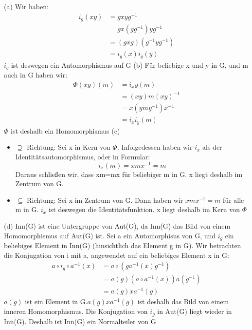 \documentclass{homework}
\begin{document}
\begin{solution}
    (a) Wir haben:
    \begin{align*}
        i_g(xy) &= gxyg^{-1}  \tag*{(nach Definition)} \\
               &= gx(gg^{-1})yg^{-1} \\
               &= (gxg)(g^{-1}yg^{-1}) \\
               &= i_g(x)i_g(y)
     \end{align*}
$i_g$ ist deswegen ein Automorphismus auf G \newline
(b)
Für beliebige x und y in G, und m auch in G haben wir:
\begin{align*}
    \Phi(xy)(m) &= i_xy(m) \\
            &= (xy)m(xy)^{-1} \tag*{(nach Definition)} \\
            &= x(ymy^{-1})x^{-1} \\
            &= i_xi_y(m)
\end{align*}
$\Phi$ ist deshalb ein Homomorphismus \newline
(c)
\begin{itemize}
    \item $\supseteq$ Richtung: Sei x in Kern von $\Phi$. Infolgedessen haben wir $i_x$ als der Identitätsautomorphismus, oder in Formular:\[
        i_x(m) = xmx^{-1} = m \tag*{(für beliebiger m in G)}
    \]
    Daraus schließen wir, dass xm=mx für beliebiger m in G. x liegt deshalb im Zentrum von G.
    \item $\subseteq$ Richtung: Sei x im Zentrum von G. Dann haben wir $xmx^{-1} = m$ für alle m in G. $i_x$ ist deswegen die Identitätsfunktion. x liegt deshalb im Kern von $\Phi$
\end{itemize}
(d) Inn(G) ist eine Untergruppe von Aut(G), da Inn(G) das Bild von einem Homomorphismus auf Aut(G) ist. Sei a ein Automorphisus von G, und $i_g$ ein beliebiges Element in Inn(G) (hinsichtlich das Element g in G). Wir betrachten die Konjugation von i mit a, angewendet auf ein beliebiges Element x in G:
\begin{align*}
    a \circ i_g \circ a^{-1} (x)&= a \circ (ga^{-1} (x)g^{-1}) \\
    &= a(g) (a \circ a^{-1} (x)) a(g^{-1}) \tag*{(Da a ist ein Automorphismus ist)} \\
    &= a(g)x a^{-1}(g)
\end{align*}
$a(g)$ ist ein Element in G.$a(g)x a^{-1}(g)$ ist deshalb das Bild von einem inneren Homomorphismus. Die Konjugation von $i_g$ in Aut(G) liegt wieder in Inn(G). Deshalb ist Inn(G) ein Normalteiler von G

\end{solution}
\end{document}
